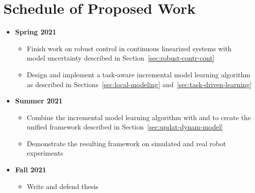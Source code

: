 \section{Schedule of Proposed Work}
\label{sec:sched-prop-work}

\begin{itemize}
\item \textbf{Spring 2021}
  \begin{itemize}
  \item Finish work on robust control in continuous linearized systems
    with model uncertainty described in Section~\ref{sec:robust-contr-cont}
  \item Design and implement a task-aware incremental model learning
    algorithm as described in Sections~\ref{sec:local-modeling} and~\ref{sec:task-driven-learning}
  \end{itemize}
\item \textbf{Summer 2021}
  \begin{itemize}
  \item Combine the incremental model learning algorithm with \cmax{}
    and \cmaxpp{} to create the unified framework described in
    Section~\ref{sec:updat-dynam-model}
  \item Demonstrate the resulting framework on simulated and real
    robot experiments
  \end{itemize}
\item \textbf{Fall 2021}
  \begin{itemize}
  \item Write and defend thesis
  \end{itemize}
\end{itemize}


